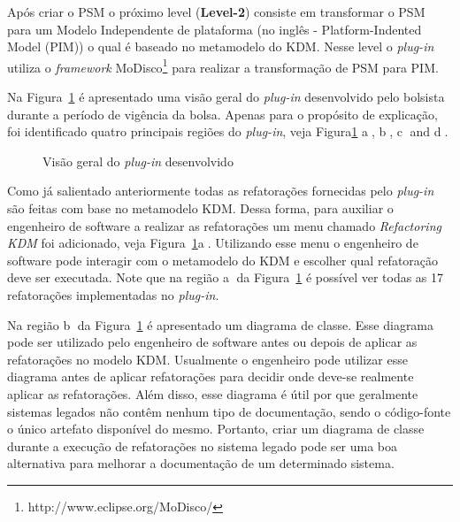 Após criar o PSM o próximo level (\textbf{Level-2}) consiste em transformar o PSM para um Modelo Independente de plataforma (no inglês - Platform-Indented Model (PIM)) o qual é baseado no metamodelo do KDM. Nesse level o \textit{plug-in} utiliza o \textit{framework} MoDisco\footnote{http://www.eclipse.org/MoDisco/} para realizar a transformação de PSM para PIM.

Na Figura~\ref{fig:plugin} é apresentado uma visão geral do \textit{plug-in} desenvolvido pelo bolsista durante a período de vigência da bolsa. Apenas para o propósito de explicação, foi identificado quatro principais regiões do \textit{plug-in}, veja Figura\ref{fig:plugin} \textcircled{a}, \textcircled{b}, \textcircled{c} and \textcircled{d}.

\begin{figure}[!h]
 \centering
\caption{Visão geral do \textit{plug-in} desenvolvido}
 \label{fig:plugin}
\end{figure}

Como já salientado anteriormente todas as refatorações fornecidas pelo \textit{plug-in} são feitas com base no metamodelo KDM. Dessa forma, para auxiliar o engenheiro de software a realizar as refatorações um menu chamado \textit{Refactoring KDM} foi adicionado, veja Figura~\ref{fig:plugin}\textcircled{a}. Utilizando esse menu o engenheiro de software pode interagir com o metamodelo do KDM e escolher qual refatoração deve ser executada. Note que na região \textcircled{a} da Figura~\ref{fig:plugin} é possível ver todas as 17 refatorações implementadas no \textit{plug-in}.

Na região \textcircled{b} da Figura~\ref{fig:plugin} é apresentado um diagrama de classe. Esse diagrama pode ser utilizado pelo engenheiro de software antes ou depois de aplicar as refatorações no modelo KDM. Usualmente o engenheiro pode utilizar esse diagrama antes de aplicar refatorações para decidir onde deve-se realmente aplicar as refatorações. Além disso, esse diagrama é útil por que geralmente sistemas legados não contêm nenhum tipo de documentação, sendo o código-fonte o único artefato disponível do mesmo. Portanto, criar um diagrama de classe durante a execução de refatorações no sistema legado pode ser uma boa alternativa para melhorar a documentação de um determinado sistema.

